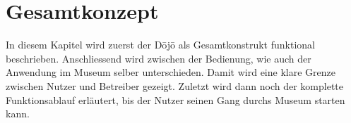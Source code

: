 \section{Gesamtkonzept}\label{sec:gesamtkonzept}
In diesem Kapitel wird zuerst der Dōjō als Gesamtkonstrukt funktional beschrieben. Anschliessend wird zwischen der Bedienung, wie auch der Anwendung im Museum selber unterschieden. Damit wird eine klare Grenze zwischen Nutzer und Betreiber gezeigt. Zuletzt wird dann noch der komplette Funktionsablauf erläutert, bis der Nutzer seinen Gang durchs Museum starten kann.